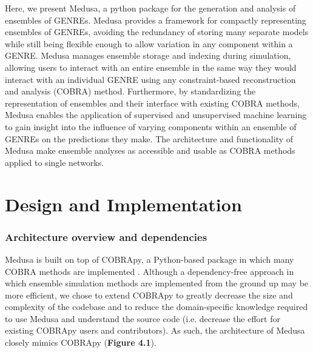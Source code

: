 \documentclass[11pt,twocolumn,notitlepage,openany,twoside]{book}
\begin{document}
\begin{refsection}
Here, we present Medusa, a python package for the generation and analysis of ensembles of GENREs. Medusa provides a framework for compactly representing ensembles of GENREs, avoiding the redundancy of storing many separate models while still being flexible enough to allow variation in any component within a GENRE. Medusa manages ensemble storage and indexing during simulation, allowing users to interact with an entire ensemble in the same way they would interact with an individual GENRE using any constraint-based reconstruction and analysis (COBRA) method. Furthermore, by standardizing the representation of ensembles and their interface with existing COBRA methods, Medusa enables the application of supervised and unsupervised machine learning to gain insight into the influence of varying components within an ensemble of GENREs on the predictions they make. The architecture and functionality of Medusa make ensemble analyses as accessible and usable as COBRA methods applied to single networks.


\section{Design and Implementation}
\subsubsection{Architecture overview and dependencies}

Medusa is built on top of COBRApy, a Python-based package in which many COBRA methods are implemented \cite{Ebrahim2013-eb}. Although a dependency-free approach in which ensemble simulation methods are implemented from the ground up may be more efficient, we chose to extend COBRApy to greatly decrease the size and complexity of the codebase and to reduce the domain-specific knowledge required to use Medusa and understand the source code (i.e. decrease the effort for existing COBRApy users and contributors). As such, the architecture of Medusa closely mimics COBRApy (\textbf{Figure 4.1}).


\end{refsection}
\end{document}
